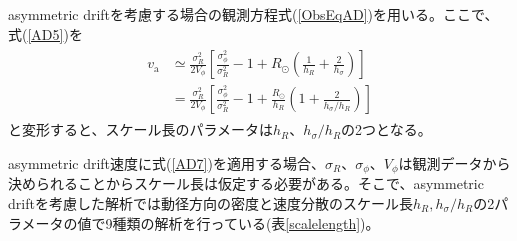 
asymmetric driftを考慮する場合の観測方程式(\ref{ObsEqAD})を用いる。ここで、式(\ref{AD5})を
\begin{align}
\begin{aligned}
    v_{\mathrm{a}} &\simeq \frac{\sigma_R^2}{2V_{\phi}} \left[\frac{\sigma_{\phi}^2}{\sigma_R^2} - 1 + R_{\odot}\left(\frac{1}{h_R} + \frac{2}{h_{\sigma}}\right)\right] \\
    &= \frac{\sigma_R^2}{2V_{\phi}} \left[\frac{\sigma_{\phi}^2}{\sigma_R^2} - 1 + \frac{R_{\odot}}{h_R}\left(1 + \frac{2}{h_{\sigma}/h_R}\right)\right]
\end{aligned} \label{AD7}
\end{align}
と変形すると、スケール長のパラメータは$h_R、h_{\sigma}/h_R$の2つとなる。

asymmetric drift速度に式(\ref{AD7})を適用する場合、$\sigma_R、\sigma_{\phi}、V_{\phi}$は観測データから決められることからスケール長は仮定する必要がある。そこで、asymmetric driftを考慮した解析では動径方向の密度と速度分散のスケール長$h_R,h_{\sigma}/h_R$の2パラメータの値で9種類の解析を行っている(表\ref{scalelength})。

